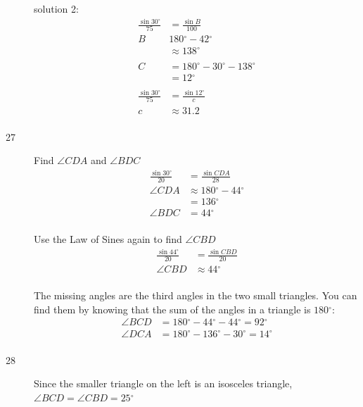 \documentclass{exam}
\newcommand{\dg}{\ensuremath{^\circ}}
\begin{document}
\begin{description}
        solution 2:
        \begin{align*}
          \frac{\sin 30 \dg}{75} & = \frac{\sin B}{100} \\
          B                      & 180 \dg - 42 \dg \\
                                 & \approx \boxed{ 138 \dg } \\
          \\
          C & = 180 \dg - 30 \dg - 138 \dg \\
            & = \boxed{ 12 \dg } \\
          \\
          \frac{\sin 30 \dg}{75} & = \frac{\sin 12 \dg}{c} \\
          c                      & \approx \boxed{ 31.2 } \\
        \end{align*}

      \item[27] 
        Find $\angle CDA$ and $\angle BDC$
        \begin{align*}
          \frac{\sin 30 \dg}{20} & = \frac{\sin CDA}{28} \\
          \angle CDA             & \approx 180 \dg - 44 \dg \\
                                 & = 136 \dg \\
          \angle BDC             & = 44 \dg \\
        \end{align*}

        Use the Law of Sines again to find $\angle CBD$
        \begin{align*}
          \frac{\sin 44 \dg}{20} & = \frac{\sin CBD}{20} \\
          \angle CBD             & \approx 44 \dg \\
        \end{align*}

        The missing angles are the third angles in the two small triangles.  You can find them by knowing that the sum
        of the angles in a triangle is $180 \dg$:
        \begin{align*}
          \angle BCD &= 180 \dg - 44 \dg - 44 \dg = \boxed{ 92 \dg } \\
          \angle DCA &= 180 \dg - 136 \dg - 30 \dg = \boxed{ 14 \dg } \\
        \end{align*}

      \item[28] 
        Since the smaller triangle on the left is an isosceles triangle, $\angle BCD = \angle CBD = 25 \dg$ 


\end{description}
\end{document}
